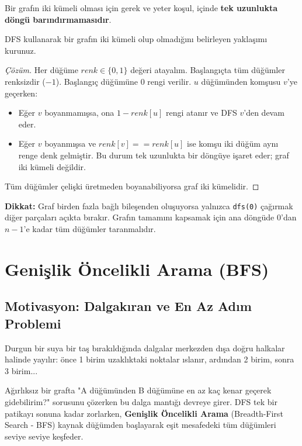 \begin{theorem}
Bir grafın iki kümeli olması için gerek ve yeter koşul, içinde \textbf{tek uzunlukta döngü barındırmamasıdır}.
\end{theorem}

\begin{example}
DFS kullanarak bir grafın iki kümeli olup olmadığını belirleyen yaklaşımı kurunuz.

\begin{proof}[Çözüm]
Her düğüme $renk \in \{0, 1\}$ değeri atayalım. Başlangıçta tüm düğümler renksizdir ($-1$).
Başlangıç düğümüne $0$ rengi verilir. $u$ düğümünden komşusu $v$'ye geçerken:
\begin{itemize}
    \item Eğer $v$ boyanmamışsa, ona $1 - renk[u]$ rengi atanır ve DFS $v$'den devam eder.
    \item Eğer $v$ boyanmışsa ve $renk[v] == renk[u]$ ise komşu iki düğüm aynı renge denk gelmiştir. Bu durum tek uzunlukta bir döngüye işaret eder; graf iki kümeli değildir.
\end{itemize}
Tüm düğümler çelişki üretmeden boyanabiliyorsa graf iki kümelidir.
\end{proof}
\end{example}

\textbf{Dikkat:} Graf birden fazla bağlı bileşenden oluşuyorsa yalnızca \texttt{dfs(0)} çağırmak diğer parçaları açıkta bırakır. Grafın tamamını kapsamak için ana döngüde $0$'dan $n-1$'e kadar tüm düğümler taranmalıdır.

\section{Genişlik Öncelikli Arama (BFS)}

\subsection{Motivasyon: Dalgakıran ve En Az Adım Problemi}
Durgun bir suya bir taş bırakıldığında dalgalar merkezden dışa doğru halkalar halinde yayılır: önce 1 birim uzaklıktaki noktalar ıslanır, ardından 2 birim, sonra 3 birim...

Ağırlıksız bir grafta "A düğümünden B düğümüne en az kaç kenar geçerek gidebilirim?" sorusunu çözerken bu dalga mantığı devreye girer. DFS tek bir patikayı sonuna kadar zorlarken, \textbf{Genişlik Öncelikli Arama} (Breadth-First Search - BFS) kaynak düğümden başlayarak eşit mesafedeki tüm düğümleri seviye seviye keşfeder.

